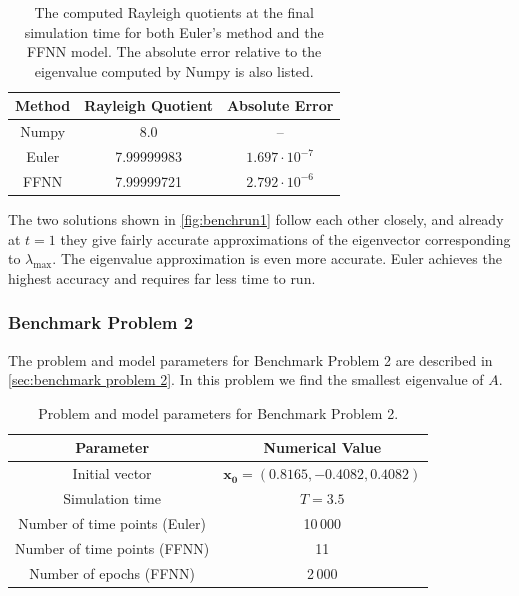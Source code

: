 \begin{table}[H]
\caption{The computed Rayleigh quotients at the final simulation time for both Euler's method and the FFNN model. The absolute error relative to the eigenvalue computed by Numpy is also listed.}
\centering
{}
\begin{tabular}{c|c|c}
\hline
\hline 
Method & Rayleigh Quotient & Absolute Error
\\
\hline 
\hline 
Numpy & 8.0 & –
\\
Euler & 7.99999983 & $1.697 \cdot 10^{-7}$  
\\
FFNN & 7.99999721 & $2.792 \cdot 10^{-6}$
\\
\hline
\hline 
\end{tabular}
\label{tab:eigbench1}
\end{table}

The two solutions shown in \autoref{fig:benchrun1} follow each other closely, and already at $t=1$ they give fairly accurate approximations of the eigenvector corresponding to $\lambda_\mathrm{max}$. The eigenvalue approximation is even more accurate. Euler achieves the highest accuracy and requires far less time to run.

\subsubsection{Benchmark Problem 2}

The problem and model parameters for Benchmark Problem 2 are described in \autoref{sec:benchmark problem 2}. In this problem we find the smallest eigenvalue of $A$.

\begin{table}[H]
\caption{Problem and model parameters for Benchmark Problem 2.}
\centering
{}
\begin{tabular}{c|c}
\hline
\hline 
Parameter & Numerical Value
\\
\hline 
\hline 
Initial vector & $\bm{x_0}=(0.8165, -0.4082,  0.4082)$
\\
Simulation time & $T=3.5$
\\
Number of time points (Euler) & 10\,000
\\
Number of time points (FFNN) & 11
\\
Number of epochs (FFNN) & 2\,000
\\
\hline
\hline 
\end{tabular}
\label{tab:parabench1}
\end{table}

